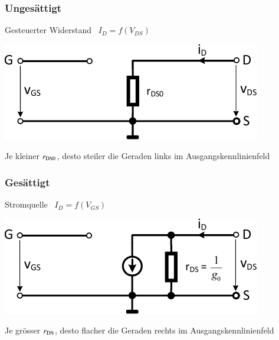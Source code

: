 \begin{minipage}[t]{0.48\columnwidth}
    \raggedright

    \subsubsection*{Ungesättigt}

    Gesteuerter Widerstand \rightarrow\ $I_D = f(V_{DS})$
    
    \includegraphics[width=\columnwidth, align=t]{images/02_MOSFET_ersatzschaltung_ungesaettigt.pdf}

    \smallskip
    Je kleiner $r_{\rm DS0}$, desto steiler die Geraden links im Ausgangskennlinienfeld

\end{minipage}
\hfill
\begin{minipage}[t]{0.48\columnwidth}
    \raggedright

    \subsubsection*{Gesättigt}

    Stromquelle \rightarrow\ $I_D = f(V_{GS})$

    \includegraphics[width=\columnwidth, align=t]{images/02_MOSFET_ersatzschaltung_gesaettigt.pdf}

    \smallskip
    Je grösser $r_{\rm DS}$, desto flacher die Geraden rechts im Ausgangskennlinienfeld
\end{minipage}


